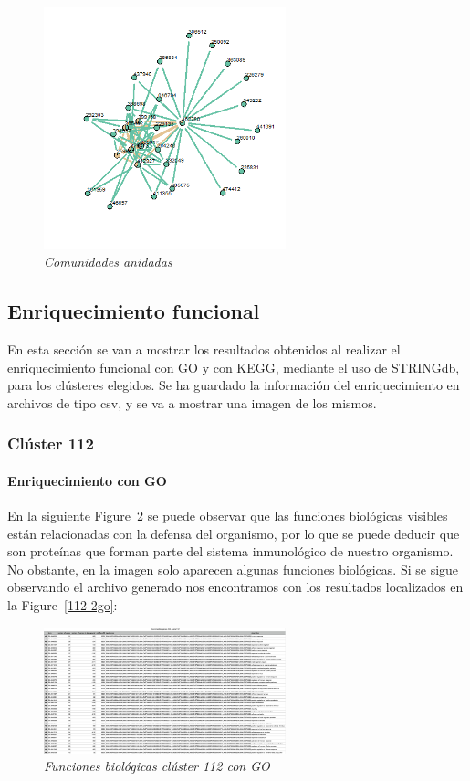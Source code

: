 \begin{figure}[h]
	\centering
	\includegraphics[width=70mm,scale=1.2]{figures/nested_comm.png}
	\caption{\textit{Comunidades anidadas}}
	\label{anidadas}
\end{figure}

\subsection{Enriquecimiento funcional}

En esta sección se van a mostrar los resultados obtenidos al realizar el enriquecimiento funcional con GO y con KEGG, mediante el uso de STRINGdb, para los clústeres elegidos.
Se ha guardado la información del enriquecimiento en archivos de tipo csv, y se va a mostrar una imagen de los mismos.

\subsubsection{Clúster 112}

\paragraph{Enriquecimiento con GO}

En la siguiente Figure~\ref{112go} se puede observar que las funciones biológicas visibles están relacionadas con la defensa del organismo, por lo que se puede deducir que son proteínas que forman parte del sistema inmunológico de nuestro organismo. No obstante, en la imagen solo aparecen algunas funciones biológicas. Si se sigue observando el archivo generado nos encontramos con los resultados localizados en la Figure~\ref{112-2go}:

\begin{figure}[h]
	\centering
	\includegraphics[width=70mm,scale=1.2]{figures/cluster112_GO.png}
	\caption{\textit{Funciones biológicas clúster 112 con GO}}
	\label{112go}
\end{figure}

